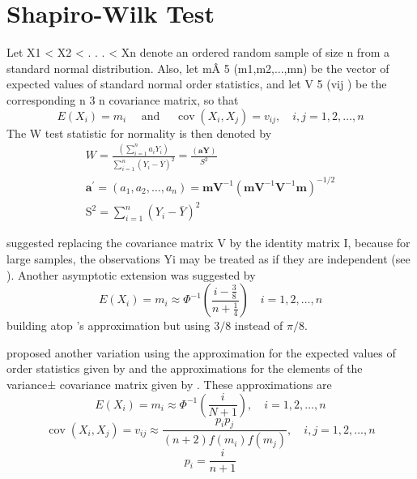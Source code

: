 \section{Shapiro-Wilk Test}
\label{sec:shapiro_wilk}

Let X1 < X2 < . . . < Xn denote an ordered random sample of size n from a standard normal distribution. Also, let mÂ 5 (m1,m2,...,mn) be the vector of expected values of standard normal order statistics, and let V 5 (vij ) be the corresponding n 3 n covariance matrix, so that
\begin{equation}
    E\left(X_{i}\right)=m_{i} \quad \text { and } \quad \operatorname{cov}\left(X_{i}, X_{j}\right)=v_{i j}, \quad i, j=1,2, \ldots, n
\end{equation}
The W test statistic \cite{shapiro1965analysis} for normality is then denoted by
\begin{equation}
    \begin{array}{l}
W=\frac{\left(\sum_{i=1}^{n} a_{i} Y_{i}\right)}{\sum_{i=1}^{n}\left(Y_{i} -\bar{Y}\right)^{2}}=\frac{(\mathbf{a} \mathbf{Y})}{S^{2}}\\
\mathbf{a}^{\prime}=\left(a_{1}, a_{2}, \ldots, a_{n}\right)=\mathbf{m} \mathbf{V}^{-1}\left(\mathbf{m} \mathbf{V}^{-1} \mathbf{V}^{-1} \mathbf{m}\right)^{-1 / 2}\\
\mathrm{S}^{2}=\sum_{i=1}^{n}\left(Y_{i}-\bar{Y}\right)^{2}
\end{array}
\end{equation}

\cite{shapiro1972approximate} suggested replacing the covariance matrix V by the identity matrix I, because for large samples, the observations {Yi} may be treated as if they are independent (see \cite{gupta1952estimation}). Another asymptotic extension was suggested by \cite{weisburg1975approximate}
\begin{equation}
    E\left(X_{i}\right)=m_{i} \approx\Phi^{-1}\left(\frac{i-\frac{3}{8}}{n+\frac{1}{4}}\right) \quad i=1,2, \ldots, n
\end{equation}
building atop \cite{elfving1947asymptotical}'s approximation but using $3/8$ instead of $\pi/8$.

\cite{rahman1997modification} proposed another variation using the approximation for the expected values of order statistics given by \cite{blom1958statistical} and the approximations for the elements of the variance± covariance matrix given by \cite{blom1958statistical,mosteller2006some}. These approximations are
\begin{equation}
    E\left(X_{i}\right)=m_{i} \approx \Phi^{-1}\left(\frac{i}{N+1}\right), \quad i=1,2, \ldots, n
\end{equation}
\begin{equation}
    \operatorname{cov}\left(X_{i}, X_{j}\right)=v_{i j} \approx \frac{p_{i} p_{j}}{(n+2) f\left(m_{i}\right) f\left(m_{j}\right)}, \quad i, j=1,2, \ldots, n
\end{equation}
\begin{equation}
    p_{i}=\frac{i}{n+1}
\end{equation}



